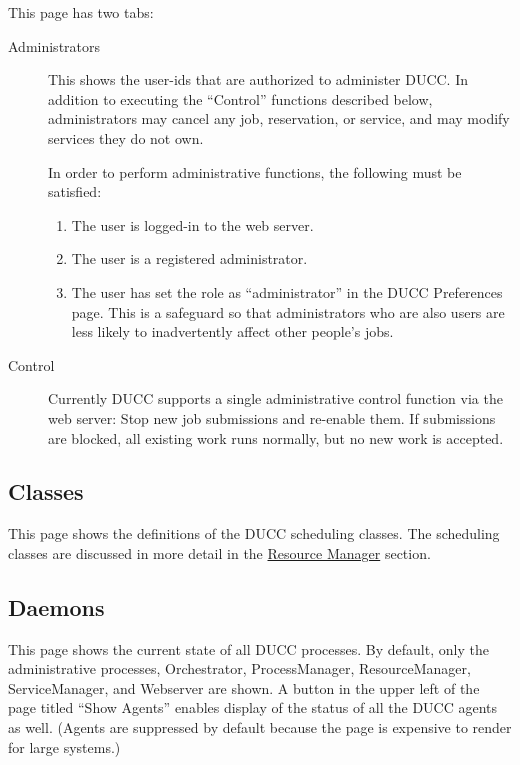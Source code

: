    This page has two tabs:
   \begin{description}   
     \item[Administrators] This shows the user-ids that are authorized to administer
       DUCC.  In addition to executing the ``Control'' functions described below,
       administrators may cancel any job, reservation, or service, and may modify
       services they do not own.  

       In order to perform administrative functions, the following must be satisfied:
       \begin{enumerate}
         \item The user is logged-in to the web server.
         \item The user is a registered administrator.
         \item The user has set the role as ``administrator'' in the DUCC Preferences
           page.  This is a safeguard so that administrators who are also users
           are less likely to inadvertently affect other people's jobs.
       \end{enumerate}
     \item[Control] Currently DUCC supports a single administrative control function
       via the web server: Stop new job submissions and re-enable them.  If submissions
       are blocked, all existing work runs normally, but no new work is accepted.
     \end{description}


\subsection{Classes}
This page shows the definitions of the DUCC scheduling classes.  The scheduling classes are
discussed in more detail in the \hyperref[sec:rm.job-classes]{Resource Manager} section.

\subsection{Daemons}
\label{sec:system-details.daemons}

This page shows the current state of all DUCC processes.  By default, only the administrative
processes, Orchestrator, ProcessManager, ResourceManager, ServiceManager, and Webserver are
shown.  A button in the upper left of the page titled ``Show Agents'' enables display of
the status of all the DUCC agents as well. (Agents are suppressed by default because the
page is expensive to render for large systems.)

